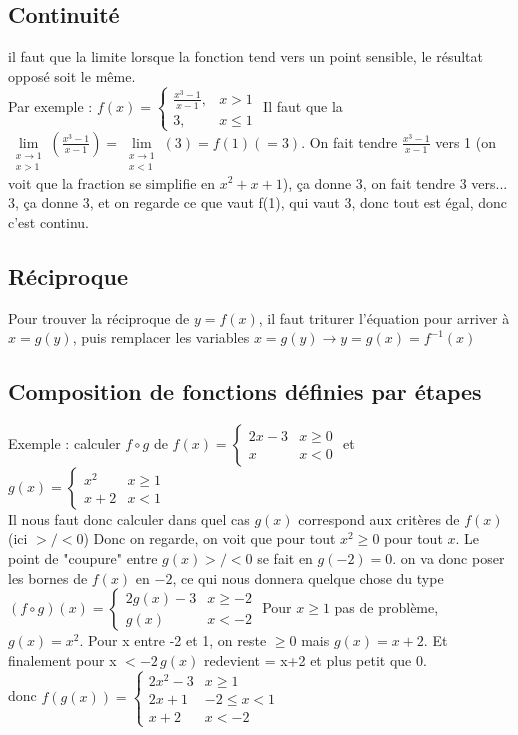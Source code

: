 \documentclass[12pt,a4paper]{article}
\newcommand{\llimite}[3]{\limite{\substack{#1 \\ #2}}\left(#3\right)}
\newcommand{\limite}{\lim\limits_}
\begin{document}
\subsection{Continuité}
il faut que la limite lorsque la fonction tend vers un point sensible, le résultat opposé soit le même. \\
Par exemple : $f(x) = \left\{\begin{array}{ll}
\frac{x^3-1}{x-1}, & x>1\\
3, & x \leq 1
\end{array}\right.$ Il faut que la $\llimite{x\to 1}{x>1}{\frac{x^3-1}{x-1}} = \llimite{x\to 1}{x < 1}{3} = f(1) (= 3)$. On fait tendre $\frac{x^3-1}{x-1}$ vers 1 (on voit que la fraction se simplifie en $x^2+x+1$), ça donne 3, on fait tendre 3 vers... 3, ça donne 3, et on regarde ce que vaut f(1), qui vaut 3, donc tout est égal, donc c'est continu.
\subsection{Réciproque}
Pour trouver la réciproque de $y=f(x)$, il faut triturer l'équation pour arriver à $x = g(y)$, puis remplacer les variables $x = g(y) \to y = g(x) = f^{-1}(x)$
\subsection{Composition de fonctions définies par étapes}
Exemple : calculer $f\circ g$ de $f(x) = 
\left\{
\begin{array}{ll}
2x-3 & x\geq 0\\
x & x < 0
\end{array}\right.$
et $g(x) = 
\left\{
\begin{array}{ll}
x^2 & x \geq 1\\
x+2 & x< 1
\end{array}\right.$\\
Il nous faut donc calculer dans quel cas $g(x)$ correspond aux critères de $f(x)$ (ici $>/< 0$) Donc on regarde, on voit que pour tout $x^2 \geq 0$ pour tout $x$. Le point de "coupure" entre $g(x) >/< 0$ se fait en $g(-2) = 0$. on va donc poser les bornes de $f(x)$ en $-2$, ce qui nous donnera quelque chose du type $(f\circ g)(x) = 
\left\{
\begin{array}{ll}
2g(x) - 3 & x \geq -2\\
g(x) & x<-2
\end{array}\right.$ Pour $x \geq 1$  pas de problème, $g(x) = x^2$. Pour x entre -2 et 1, on reste $\geq 0$ mais $g(x) = x+2$. Et finalement pour x $< -2 \, g(x)$ redevient = x+2 et plus petit que 0.\\
donc $f(g(x)) = 
\left\{
\begin{array}{ll}
2x^2-3 & x \geq 1\\
2x+1 & -2 \leq x < 1\\
x+2 & x < -2
\end{array}\right.$
\end{document}

